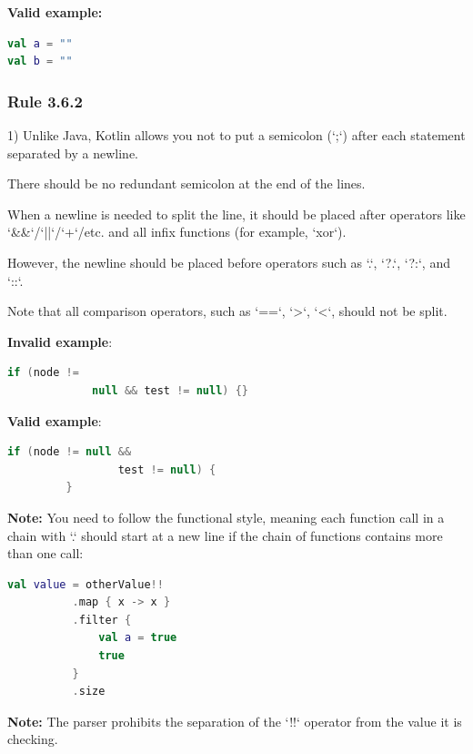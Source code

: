 {\textbf{Valid example:}

\begin{lstlisting}[language=Kotlin]
val a = ""
val b = ""
\end{lstlisting}


\subsubsection*{\textbf{Rule 3.6.2}}
\leavevmode\newline



1) Unlike Java, Kotlin allows you not to put a semicolon (`;`) after each statement separated by a newline.

    There should be no redundant semicolon at the end of the lines.



When a newline is needed to split the line, it should be placed after operators like `\&\&`/`||`/`+`/etc. and all infix functions (for example, `xor`).

However, the newline should be placed before operators such as `.`, `?.`, `?:`, and `::`.



Note that all comparison operators, such as `==`, `>`, `<`, should not be split.



\textbf{Invalid example}:

\begin{lstlisting}[language=Kotlin]
     if (node !=
             null && test != null) {}
\end{lstlisting}


\textbf{Valid example}:

\begin{lstlisting}[language=Kotlin]
         if (node != null &&
                 test != null) {
         }
\end{lstlisting}


\textbf{Note:} You need to follow the functional style, meaning each function call in a chain with `.` should start at a new line if the chain of functions contains more than one call:

\begin{lstlisting}[language=Kotlin]
  val value = otherValue!!
          .map { x -> x }
          .filter {
              val a = true
              true
          }
          .size
\end{lstlisting}
\textbf{Note:} The parser prohibits the separation of the `!!` operator from the value it is checking.



}
